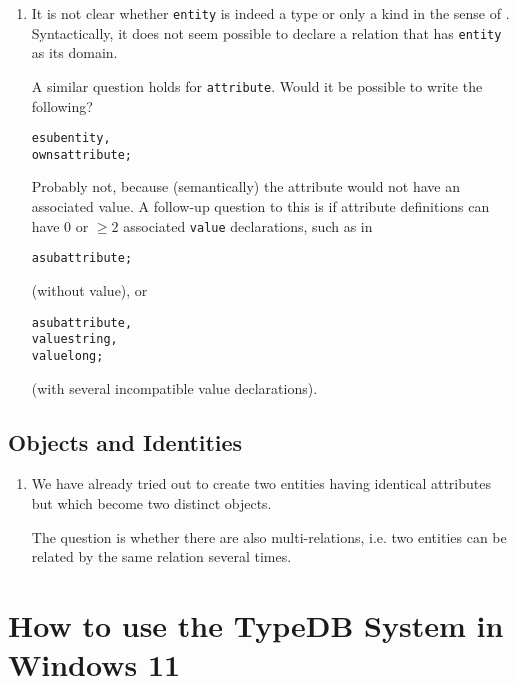 \documentclass[runningheads]{llncs}
\begin{document}
\begin{enumerate}

	


\item It is not clear whether \texttt{entity} is indeed a type or only a kind
  in the sense of . Syntactically, it does not
  seem possible to declare a relation that has \texttt{entity} as its domain.

  A similar question holds for \texttt{attribute}. Would it be possible to
  write the following?

  \begin{alltt}
  e sub entity,
    owns attribute;
  \end{alltt}

  Probably not, because (semantically) the attribute would not have an
  associated value. A follow-up question to this is if attribute definitions
  can have 0 or $\geq 2$ associated \texttt{value} declarations, such as in
  \begin{alltt}
    a sub attribute;
  \end{alltt}
  (without value),  or
  \begin{alltt}
    a sub attribute,
    value string,
    value long;
  \end{alltt}
  (with several incompatible value declarations).

\end{enumerate}



\subsection{Objects and Identities}

\begin{enumerate}
\item We have already tried out to create two entities having identical
  attributes but which become two distinct objects.

  The question is whether there are also multi-relations, i.e. two entities
  can be related by the same relation several times.
\end{enumerate}




\section{How to use the TypeDB System in Windows 11}
\end{document}
